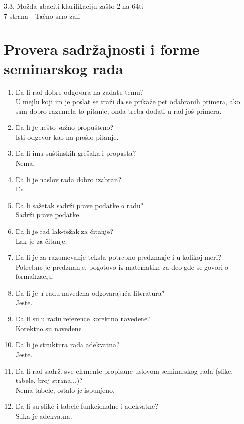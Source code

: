 \documentclass[a4paper]{report}
\begin{document}
3.3. Možda ubaciti klarifikaciju zašto 2 na 64ti \\
7 strana - Tačno smo zali 
\section{Provera sadržajnosti i forme seminarskog rada}

\begin{enumerate}
\item Da li rad dobro odgovara na zadatu temu?\\
U mejlu koji im je poslat se traži  da se prikaže pet odabranih primera, ako sam dobro razumela to pitanje, onda treba dodati u rad još primera.   

\item Da li je nešto važno propušteno?\\
Isti odgovor kao na prošlo pitanje.

\item Da li ima suštinskih grešaka i propusta?\\
Nema.

\item Da li je naslov rada dobro izabran?\\
Da.

\item Da li sažetak sadrži prave podatke o radu?\\
Sadrži prave podatke.

\item Da li je rad lak-težak za čitanje?\\
Lak je za čitanje.

\item Da li je za razumevanje teksta potrebno predznanje i u kolikoj meri?\\
Potrebno je predznanje, pogotovo iz matematike za deo gde se govori o formalizaciji.

\item Da li je u radu navedena odgovarajuća literatura?\\
Jeste.

\item Da li su u radu reference korektno navedene?\\
Korektno su navedene.

\item Da li je struktura rada adekvatna?\\
Jeste.

\item Da li rad sadrži sve elemente propisane uslovom seminarskog rada (slike, tabele, broj strana...)?\\
Nema tabele, ostalo je ispunjeno.

\item Da li su slike i tabele funkcionalne i adekvatne?\\
Slika je adekvatna.
\end{enumerate}
\end{document}
